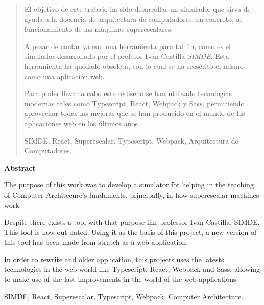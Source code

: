 \documentclass[spanish,a4paper,14pt,oneside]{extreport}
\newenvironment{summary}
{\par\noindent\begin{center}\textbf{Abstract}\end{center}\begin{itshape}\par\noindent}
{\end{itshape}}
\newenvironment{keywords}
{\begin{list}{}{\setlength{\leftmargin}{1em}}\item[\hskip\labelsep \bfseries Keywords:]}
{\end{list}}
\newenvironment{palabrasClave}
{\begin{list}{}{\setlength{\leftmargin}{1em}}\item[\hskip\labelsep \bfseries Palabras clave:]}
{\end{list}}
\begin{document}
\newpage  %
\begin{abstract}
{\em

El objetivo de este trabajo ha sido desarrollar un simulador que sirva de ayuda a la docencia
de arquitectura de computadores, en concreto, al funcionamiento de las máquinas superescalares.

\bigskip
A pesar de contar ya con una herramienta para tal fin, como es el simulador desarrollado por el 
profesor Ivan Castilla \textit{SIMDE}. Esta herramienta ha quedado obsoleta, con lo cual se ha 
reescrito el mismo como una aplicación web.

\bigskip
Para poder llevar a cabo este rediseño se han utilizado tecnologías modernas tales como Typescript, 
React, Webpack y Sass, permitiendo aprovechar todas las mejoras que se han producido en el mundo
de las aplicaciones web en los últimos años.

}

\begin{palabrasClave}
SIMDE, React, Superescalar, Typescript, Webpack, Arquitectura de Computadores.
\end{palabrasClave}

\end{abstract}

\newpage  %
\begin{summary}
{\em

The purpose of this work was to develop a simulator for helping in the teaching of Computer Architecure's 
fundaments, principally, in how superescalar machines work.

\bigskip
Despite there exists a tool with that purpose like professor Ivan Castilla: SIMDE. This tool is now out-dated. Using
it as the basis of this project, a new version of this tool has been made from stratch as a web application.

\bigskip
In order to rewrite and older application, this projects uses the latests technologies in the web world like 
Typescript, React, Webpack and Sass, allowing to make use of the last improvements in the world of
the web applications.

}

\begin{keywords}
SIMDE, React, Superescalar, Typescript, Webpack, Computer Architecture.
\end{keywords}

\end{summary}
\end{document}
